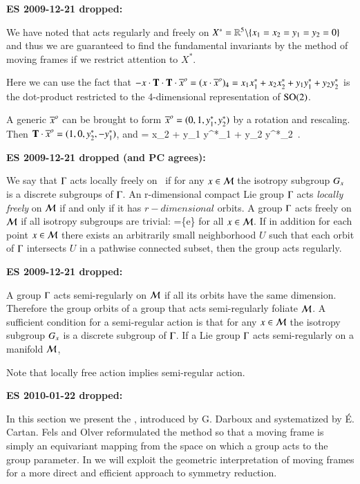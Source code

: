 {\bf ES 2009-12-21 dropped:}

We have noted that  acts regularly and freely on
$X^*=\mathbb{R}^{5}\backslash\{x_1=x_2=y_1=y_2=0\}$ and thus we are
guaranteed to find the fundamental invariants by the method
of moving frames if we restrict attention to $X^*$.


Here we can use the fact that
$- x \cdot \mathbf{T}\cdot\mathbf{T} \cdot {\ensuremath{\overline{x}^o}}
 = (x \cdot {\ensuremath{\overline{x}^o}} )_4 =
    x_1 x_1^{*}
   +x_2 x_2^{*}
   +y_1 y_1^{*}
   +y_2 y_2^{*}
$
is the dot-product restricted to the 4-dimensional
representation of $\textrm{SO}(2)$.

A generic  $ {\overline{x}^o} $ can be brought to form $ {\overline{x}^o}  =
(0,1,y_1^{*},y_2^{*})$ by a rotation and rescaling. Then $\mathbf{T}
\cdot {\ensuremath{\overline{x}^o}}   = (1,0,y_2^{*},-y_1^{*})$, and
\beq
{} =
     {x_2 + y_1 y^{*}_1 + y_2 y^{*}_2}
\,.
\label{PCsectSin}
\eeq


 {\bf ES 2009-12-21 dropped (and PC agrees):}

We say that $\Gamma$ acts locally freely on \pS\ if for any
$x\in{\cal M}$ the isotropy subgroup $G_{x}$ is a
discrete subgroups of $\Gamma$. An r-dimensional compact Lie
group $\Gamma$ acts \emph{locally freely} on ${\cal M}$ if and
only if it has $r-dimensional$ orbits. A
group $\Gamma$ acts freely on ${\cal M}$ if all isotropy subgroups
are trivial: \stab{\ssp}=\{e\} for all $x\in \mathcal{M}$. If
in addition for each point $x\in \mathcal{M}$ there exists an
arbitrarily small neighborhood $U$ such that each orbit of
$\Gamma$ intersects $U$ in a pathwise connected subset, then
the group acts regularly.

{\bf ES 2009-12-21 dropped:}

A group $\Gamma$ acts semi-regularly on ${\cal M}$ if all its
orbits have the same dimension. Therefore the group orbits of
a group that acts semi-regularly foliate ${\cal M}$. A sufficient
condition for a semi-regular action is that for any
$x\in{\cal M}$ the isotropy subgroup $G_{x}$ is a
discrete subgroup of $\Gamma$. If a Lie group $\Gamma$ acts
semi-regularly on a manifold $\mathcal{M}$,

Note that locally free action implies semi-regular action.

{\bf ES 2010-01-22 dropped:}

In this section we present the {\mframes}, introduced by G. Darboux and
systematized by \'E. Cartan.
Fels and Olver reformulated the method so that a
moving frame is simply an equivariant mapping from the space on which a
group acts to the group parameter.  In  we will
exploit the geometric interpretation of moving frames for a more direct and
efficient approach to symmetry reduction. 


